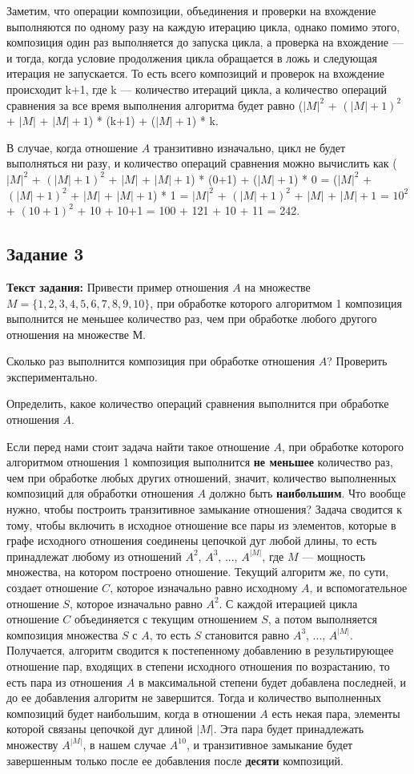 \documentclass[12pt]{article}
\begin{document}
	Заметим, что операции композиции, объединения и проверки на вхождение выполняются по одному разу на каждую итерацию цикла, однако помимо этого, композиция один раз выполняется до запуска цикла, а проверка на вхождение --- и тогда, когда условие продолжения цикла обращается в ложь и следующая итерация не запускается. То есть всего композиций и проверок на вхождение происходит k+1, где k --- количество итераций цикла, а количество операций сравнения за все время выполнения алгоритма будет равно ($|M|^2$ + $(|M|+1)^2$ + $|M|$ + $|M|+1$) * (k+1) + ($|M|+1$) * k. 
	
	В случае, когда отношение $A$ транзитивно изначально, цикл не будет выполняться ни разу, и количество операций сравнения можно вычислить как ($|M|^2$ + $(|M|+1)^2$ + $|M|$ + $|M|+1$) * (0+1) + ($|M|+1$) * 0 = ($|M|^2$ + $(|M|+1)^2$ + $|M|$ + $|M|+1$) * 1 = $|M|^2$ + $(|M|+1)^2$ + $|M|$ + $|M|+1$ = $10^2$ + $(10+1)^2$ + 10 + 10+1 = 100 + 121 + 10 + 11 = 242.
	
	\subsection{Задание 3}
	\label{task3}
	{\bf Текст задания:} Привести пример отношения $A$ на множестве $M = \{1, 2, 3, 4, 5, 6, 7, 8, 9, 10\}$, при обработке которого алгоритмом 1 композиция выполнится не меньшее количество раз, чем при обработке любого другого отношения на множестве М.
	
	Сколько раз выполнится композиция при обработке отношения $A$? Проверить экспериментально.
	
	Определить, какое количество операций сравнения выполнится при обработке отношения $A$.

	Если перед нами стоит задача найти такое отношение $A$, при обработке которого алгоритмом отношения 1 композиция выполнится {\bf не меньшее} количество раз, чем при обработке любых других отношений, значит, количество выполненных композиций для обработки отношения $A$ должно быть {\bf наибольшим}. Что вообще нужно, чтобы построить транзитивное замыкание отношения? Задача сводится к тому, чтобы включить в исходное отношение все пары из элементов, которые в графе исходного отношения соединены цепочкой дуг любой длины, то есть принадлежат любому из отношений $A^{2}$, $A^3$, ..., $A^{|M|}$, где $M$ --- мощность множества, на котором построено отношение. Текущий алгоритм же, по сути, создает отношение $C$, которое изначально равно исходному $A$, и вспомогательное отношение $S$, которое изначально равно $A^2$. С каждой итерацией цикла отношение $C$ объединяется с текущим отношением $S$, а потом выполняется композиция множества $S$ с $A$, то есть $S$ становится равно $A^3$, ..., $A^{|M|}$. Получается, алгоритм сводится к постепенному добавлению в результирующее отношение пар, входящих в степени исходного отношения по возрастанию, то есть пара из отношения $A$ в максимальной степени будет добавлена последней, и до ее добавления алгоритм не завершится. Тогда и количество выполненных композиций будет наибольшим, когда в отношении $A$ есть некая пара, элементы которой связаны цепочкой дуг длиной $|M|$. Эта пара будет принадлежать множеству $A^{|M|}$, в нашем случае $A^{10}$, и транзитивное замыкание будет завершенным только после ее добавления после {\bf десяти} композиций.
	
\end{document}
